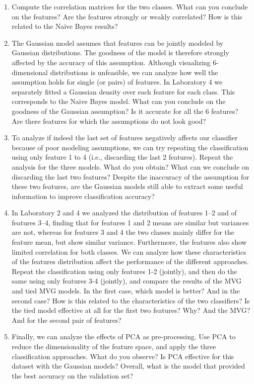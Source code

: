 \documentclass[a4paper, 12pt, english]{article}
\begin{document}
\begin{enumerate}
        \item Compute the correlation matrices for the two classes. What can you conclude on the features? Are the features strongly or weakly correlated? How is this related to the Naive Bayes results?
        \item The Gaussian model assumes that features can be jointly modeled by Gaussian distributions. The goodness of the model is therefore strongly affected by the accuracy of this assumption. Although visualizing 6-dimensional distributions is unfeasible, we can analyze how well the assumption holds for single (or pairs) of features. In Laboratory 4 we separately fitted a Gaussian density over each feature for each class. This corresponds to the Naive Bayes model. What can you conclude on the goodness of the Gaussian assumption? Is it accurate for all the 6 features? Are there features for which the assumptions do not look good?
        \item To analyze if indeed the last set of features negatively affects our classifier because of poor modeling assumptions, we can try repeating the classification using only feature 1 to 4 (i.e., discarding the last 2 features). Repeat the analysis for the three models. What do you obtain? What can we conclude on discarding the last two features? Despite the inaccuracy of the assumption for these two features, are the Gaussian models still able to extract some useful information to improve classification accuracy?
        \item In Laboratory 2 and 4 we analyzed the distribution of features 1--2 and of features 3--4, finding that for features 1 and 2 means are similar but variances are not, whereas for features 3 and 4 the two classes mainly differ for the feature mean, but show similar variance. Furthermore, the features also show limited correlation for both classes. We can analyze how these characteristics of the features distribution affect the performance of the different approaches. Repeat the classification using only features 1-2 (jointly), and then do the same using only features 3-4 (jointly), and compare the results of the MVG and tied MVG models. In the first case, which model is better? And in the second case? How is this related to the characteristics of the two classifiers? Is the tied model effective at all for the first two features? Why? And the MVG? And for the second pair of features?
        \item Finally, we can analyze the effects of PCA as pre-processing. Use PCA to reduce the dimensionality of the feature space, and apply the three classification approaches. What do you observe? Is PCA effective for this dataset with the Gaussian models? Overall, what is the model that provided the best accuracy on the validation set?
    \end{enumerate}
\end{document}
